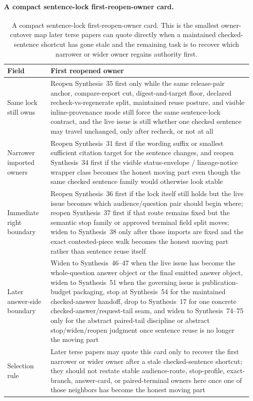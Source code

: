 \documentclass[11pt]{article}
\begin{document}
\paragraph{A compact sentence-lock first-reopen-owner card.}
\begin{table}[t]
\centering
\small
\begin{tabularx}{\linewidth}{@{}lX@{}}
\toprule
Field & First reopened owner \\
\midrule
Same lock still owns & Reopen Synthesis~35 first only while the same release-pair anchor, compare-report cut, digest-and-target floor, declared recheck-vs-regenerate split, maintained reuse posture, and visible inline-provenance mode still force the same sentence-lock contract, and the live issue is still whether one checked sentence may travel unchanged, only after recheck, or not at all \\
Narrower imported owners & Reopen Synthesis~31 first if the wording suffix or smallest sufficient citation target for the sentence changes, and reopen Synthesis~34 first if the visible status-envelope / lineage-notice wrapper class becomes the honest moving part even though the same checked sentence family would otherwise look stable \\
Immediate right boundary & Reopen Synthesis~36 first if the lock itself still holds but the live issue becomes which audience/question pair should begin where; reopen Synthesis~37 first if that route remains fixed but the semantic stop family or approved terminal field split moves; widen to Synthesis~38 only after those imports are fixed and the exact contested-piece walk becomes the honest moving part rather than sentence reuse itself \\
Later answer-side boundary & Widen to Synthesis~46--47 when the live issue has become the whole-question answer object or the final emitted answer object, widen to Synthesis~51 when the governing issue is publication-budget packaging, stop at Synthesis~54 for the maintained checked-answer handoff, drop to Synthesis~17 for one concrete checked-answer/request-tail seam, and widen to Synthesis~74--75 only for the abstract paired-tail discipline or abstract stop/widen/reopen judgment once sentence reuse is no longer the moving part \\
Selection rule & Later terse papers may quote this card only to recover the first narrower or wider owner after a stale checked-sentence shortcut; they should not restate stable audience-route, stop-profile, exact-branch, answer-card, or paired-terminal owners here once one of those neighbors has become the honest moving part \\
\bottomrule
\end{tabularx}
\caption{A compact sentence-lock first-reopen-owner card. This is the smallest owner-cutover map later terse papers can quote directly when a maintained checked-sentence shortcut has gone stale and the remaining task is to recover which narrower or wider owner regains authority first.}
\label{tab:sentence-lock-first-reopen-owner-card}
\end{table}
\end{document}
